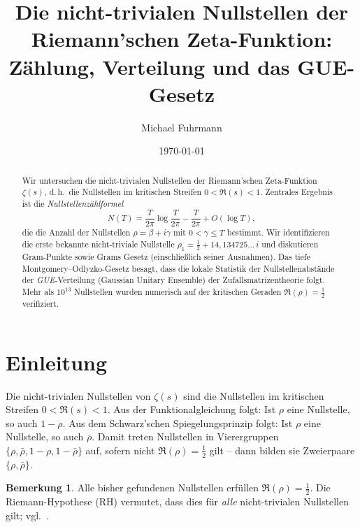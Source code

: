 \documentclass[12pt,a4paper]{amsart}
\theoremstyle{definition}
\newtheorem{remark}[theorem]{Bemerkung}
\begin{document}

\title{Die nicht-trivialen Nullstellen der Riemann'schen Zeta-Funktion:\\
       Z\"ahlung, Verteilung und das GUE-Gesetz}

\author{Michael Fuhrmann}
\address{Specialist Mathematics Project, Build 84}
\date{\today}

\begin{abstract}
Wir untersuchen die nicht-trivialen Nullstellen der Riemann'schen Zeta-Funktion
$\zeta(s)$, d.\,h.\ die Nullstellen im kritischen Streifen $0 < \Re(s) < 1$.
Zentrales Ergebnis ist die \emph{Nullstellenz\"ahlformel}
\[
  N(T) = \frac{T}{2\pi}\log\frac{T}{2\pi} - \frac{T}{2\pi} + O(\log T),
\]
die die Anzahl der Nullstellen $\rho = \beta + i\gamma$ mit
$0 < \gamma \le T$ bestimmt.
Wir identifizieren die erste bekannte nicht-triviale Nullstelle
$\rho_1 = \tfrac{1}{2} + 14{,}134725\ldots\,i$ und diskutieren
Gram-Punkte sowie Grams Gesetz (einschlie\ss lich seiner Ausnahmen).
Das tiefe Montgomery--Odlyzko-Gesetz besagt, dass die lokale Statistik der
Nullstellenabst\"ande der \emph{GUE}-Verteilung (Gaussian Unitary Ensemble)
der Zufallsmatrizentheorie folgt.
Mehr als $10^{13}$ Nullstellen wurden numerisch auf der kritischen
Geraden $\Re(\rho) = \tfrac{1}{2}$ verifiziert.
\end{abstract}

\maketitle
\tableofcontents

\section{Einleitung}

Die nicht-trivialen Nullstellen von $\zeta(s)$ sind die Nullstellen
im kritischen Streifen $0 < \Re(s) < 1$.
Aus der Funktionalgleichung folgt: Ist $\rho$ eine Nullstelle, so auch
$1-\rho$. Aus dem Schwarz'schen Spiegelungsprinzip folgt: Ist $\rho$
eine Nullstelle, so auch $\bar\rho$.
Damit treten Nullstellen in Vierergruppen
$\{\rho, \bar\rho, 1-\rho, 1-\bar\rho\}$ auf, sofern nicht
$\Re(\rho) = \tfrac{1}{2}$ gilt -- dann bilden sie Zweierpaare
$\{\rho, \bar\rho\}$.

\begin{remark}
Alle bisher gefundenen Nullstellen erf\"ullen $\Re(\rho) = \tfrac{1}{2}$.
Die Riemann-Hypothese (RH) vermutet, dass dies f\"ur \emph{alle}
nicht-trivialen Nullstellen gilt; vgl.\ \cite{Riemann1859}.
\end{remark}
\end{document}
